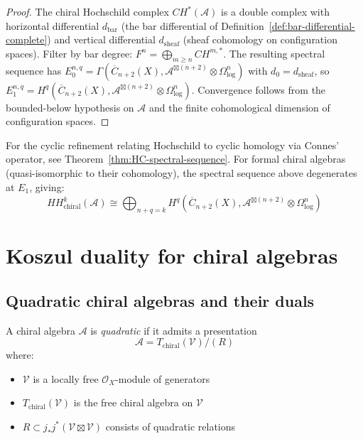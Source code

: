 \begin{proof}
The chiral Hochschild complex $CH^*(\mathcal{A})$ is a double complex with horizontal differential $d_{\mathrm{bar}}$ (the bar differential of Definition~\ref{def:bar-differential-complete}) and vertical differential $d_{\mathrm{sheaf}}$ (sheaf cohomology on configuration spaces).  Filter by bar degree: $F^n = \bigoplus_{m \geq n} CH^{m,*}$.  The resulting spectral sequence has $E_0^{n,q} = \Gamma(\overline{C}_{n+2}(X), \mathcal{A}^{\boxtimes(n+2)} \otimes \Omega^n_{\log})$ with $d_0 = d_{\mathrm{sheaf}}$, so $E_1^{n,q} = H^q(\overline{C}_{n+2}(X), \mathcal{A}^{\boxtimes(n+2)} \otimes \Omega^n_{\log})$.  Convergence follows from the bounded-below hypothesis on $\mathcal{A}$ and the finite cohomological dimension of configuration spaces.
\end{proof}

For the cyclic refinement relating Hochschild to cyclic homology via Connes' operator, see Theorem~\ref{thm:HC-spectral-sequence}.  For formal chiral algebras (quasi-isomorphic to their cohomology), the spectral sequence above degenerates at $E_1$, giving:
\[
HH^k_{\text{chiral}}(\mathcal{A}) \cong \bigoplus_{n+q=k} H^q(\overline{C}_{n+2}(X), \mathcal{A}^{\boxtimes (n+2)} \otimes \Omega^n_{\log})
\]

\section{Koszul duality for chiral algebras}

\subsection{Quadratic chiral algebras and their duals}

\begin{definition}
A chiral algebra $\mathcal{A}$ is \emph{quadratic} if it admits a presentation
\[
\mathcal{A} = T_{\text{chiral}}(\mathcal{V})/(R)
\]
where:
\begin{itemize}
\item $\mathcal{V}$ is a locally free $\mathcal{O}_X$-module of generators
\item $T_{\text{chiral}}(\mathcal{V})$ is the free chiral algebra on $\mathcal{V}$
\item $R \subset j_*j^*(\mathcal{V} \boxtimes \mathcal{V})$ consists of quadratic relations
\end{itemize}
\end{definition}

